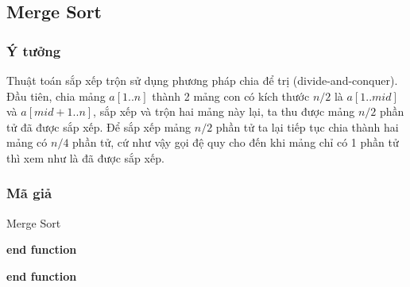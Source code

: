 \subsection{Merge Sort}

\subsubsection{Ý tưởng}

Thuật toán sắp xếp trộn sử dụng phương pháp chia để trị (divide-and-conquer). Đầu tiên, chia mảng $a[1..n]$ thành 2 mảng con có kích thước $n/2$ là $a[1..mid]$ và $a[mid + 1..n]$, sắp xếp và trộn hai mảng này lại, ta thu được mảng $n/2$ phần tử đã được sắp xếp. Để sắp xếp mảng $n/2$ phần tử ta lại tiếp tục chia thành hai mảng có $n/4$ phần tử, cứ như vậy gọi đệ quy cho đến khi mảng chỉ có 1 phần tử thì xem như là đã được sắp xếp.

\subsubsection{Mã giả}

\begin{algorithm}[H]
\caption{Merge Sort}
\label{merge-sort}

\textbf{end function}

\textbf{end function}
\end{algorithm}

